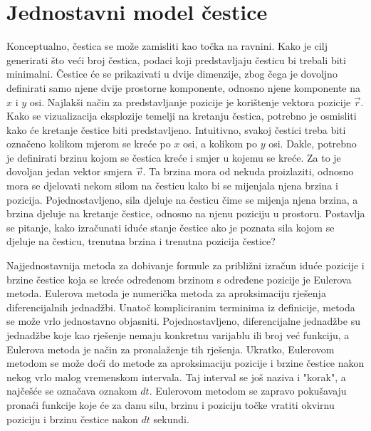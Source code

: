\documentclass{foi}
\begin{document}
\section{Jednostavni model čestice}
 Konceptualno, čestica se može zamisliti kao točka na ravnini. Kako je cilj generirati što veći broj čestica, podaci koji predstavljaju česticu bi trebali biti minimalni. Čestice će se prikazivati u dvije dimenzije, zbog čega je dovoljno definirati samo njene dvije prostorne komponente, odnosno njene komponente na $x$ i $y$ osi. Najlakši način za predstavljanje pozicije je korištenje vektora pozicije $\vec{r}$. Kako se vizualizacija eksplozije temelji na kretanju čestica, potrebno je osmisliti kako će kretanje čestice biti predstavljeno. Intuitivno, svakoj čestici treba biti označeno kolikom mjerom se kreće po $x$ osi, a kolikom po $y$ osi. Dakle, potrebno je definirati brzinu kojom se čestica kreće i smjer u kojemu se kreće. Za to je dovoljan jedan vektor smjera $\vec{v}$. Ta brzina mora od nekuda proizlaziti, odnosno mora se djelovati nekom silom na česticu kako bi se mijenjala njena brzina i pozicija. Pojednostavljeno, sila djeluje na česticu čime se mijenja njena brzina, a brzina djeluje na kretanje čestice, odnosno na njenu poziciju u prostoru. Postavlja se pitanje, kako izračunati iduće stanje čestice ako je poznata sila kojom se djeluje na česticu, trenutna brzina i trenutna pozicija čestice?

 Najjednostavnija metoda za dobivanje formule za približni izračun iduće pozicije i brzine čestice koja se kreće određenom brzinom s određene pozicije je Eulerova metoda. Eulerova metoda je numerička metoda za aproksimaciju rješenja diferencijalnih jednadžbi. Unatoč kompliciranim terminima iz definicije, metoda se može vrlo jednostavno objasniti. Pojednostavljeno, diferencijalne jednadžbe su jednadžbe koje kao rješenje nemaju konkretnu varijablu ili broj već funkciju, a Eulerova metoda je način za pronalaženje tih rješenja. Ukratko, Eulerovom metodom se može doći do metode za aproksimaciju pozicije i brzine čestice nakon nekog vrlo malog vremenskom intervala. Taj interval se još naziva i "korak", a najčešće se označava oznakom $dt$. Eulerovom metodom se zapravo pokušavaju pronaći funkcije koje će za danu silu, brzinu i poziciju točke vratiti okvirnu poziciju i brzinu čestice nakon $dt$ sekundi.
\end{document}
